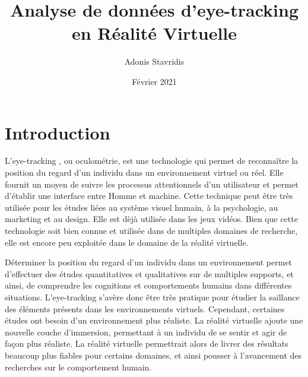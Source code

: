 \documentclass[12pt]{article}
\title{\textbf{Analyse de données d’eye-tracking en Réalité Virtuelle}}
\author{\Large{Adonis Stavridis}}
\date{Février 2021}
\begin{document}

\maketitle
\tableofcontents
\pagebreak


\section{Introduction}

L'eye-tracking \cite{wiki:eye_tracking}, ou oculométrie, est une technologie
qui permet de reconnaître la position du regard d'un individu dans un
environnement virtuel ou réel. Elle fournit un moyen de suivre les processus
attentionnels d'un utilisateur et permet d'établir une interface entre
Homme et machine. Cette technique peut être très utilisée pour les études liées
au système visuel humain, à la psychologie, au marketing et au design. Elle est
dèjà utilisée dans les jeux vidéos. Bien que cette technologie soit bien connue
et utilisée dans de multiples domaines de recherche, elle est encore peu
exploitée dans le domaine de la réalité virtuelle.

\bigskip
Déterminer la position du regard d'un individu dans un environnement permet
d'effectuer des études quantitatives et qualitatives sur de multiples supports,
et ainsi, de comprendre les cognitions et comportements humains dans différentes
situations. L'eye-tracking s'avère donc être très pratique pour étudier la
saillance des éléments présents dans les environnements virtuels. Cependant,
certaines études ont besoin d'un environnement plus réaliste. La réalité
virtuelle ajoute une nouvelle couche d'immersion, permettant à un individu de
se sentir et agir de façon plus réaliste. La réalité virtuelle permettrait
alors de livrer des résultats beaucoup plus fiables pour certains domaines, et
ainsi pousser à l'avancement des recherches sur le comportement humain.
\end{document}
